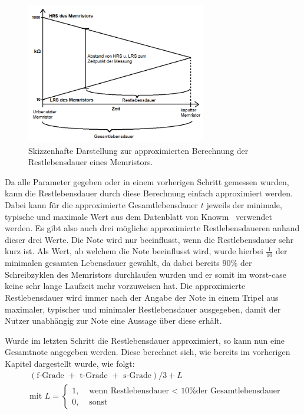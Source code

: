 \begin{figure}
  \centering
    \includegraphics[width=0.7\textwidth]{images/Lebensdauer_Skizze.png}
  \caption{Skizzenhafte Darstellung zur approximierten Berechnung der Restlebensdauer eines Memristors.}
  \label{fig:Lebensdauer_Skizze}
\end{figure}

Da alle Parameter gegeben oder in einem vorherigen Schritt gemessen wurden, kann die Restlebensdauer durch diese Berechnung einfach approximiert werden. Dabei kann für die approximierte Gesamtlebensdauer $t$ jeweils der minimale, typische und maximale Wert aus dem Datenblatt von Knowm~\cite{knowm_comp_2019} verwendet werden. Es gibt also auch drei mögliche approximierte Restlebensdaueren anhand dieser drei Werte. Die Note wird nur beeinflusst, wenn die Restlebensdauer sehr kurz ist. Als Wert, ab welchem die Note beeinflusst wird, wurde hierbei $\frac{1}{10}$ der minimalen gesamten Lebensdauer gewählt, da dabei bereits $90\%$ der Schreibzyklen des Memristors durchlaufen wurden und er somit im worst-case keine sehr lange Laufzeit mehr vorzuweisen hat. Die approximierte Restlebensdauer wird immer nach der Angabe der Note in einem Tripel aus maximaler, typischer und minimaler Restlebensdauer ausgegeben, damit der Nutzer unabhängig zur Note eine Aussage über diese erhält.

Wurde im letzten Schritt die Restlebensdauer approximiert, so kann nun eine Gesamtnote angegeben werden. Diese berechnet sich, wie bereits im vorherigen Kapitel dargestellt wurde, wie folgt:
\begin{align}
  &(\text{f-Grade } + \text{ t-Grade } + \text{ s-Grade})/3 + L\\
  &\text{mit } L =
  \begin{cases}
      1, &\text{ wenn Restlebensdauer < 10\% der Gesamtlebensdauer} \\
      0, &\text{ sonst}
  \end{cases}\nonumber
\end{align}

